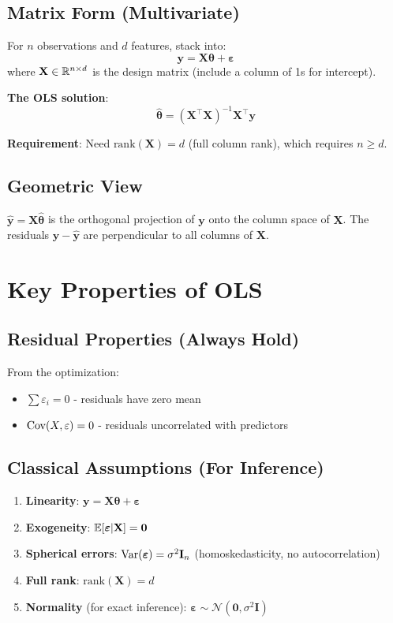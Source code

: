\documentclass[main.tex]{subfiles}
\begin{document}
\subsection{Matrix Form (Multivariate)}

For $n$ observations and $d$ features, stack into:
$$\mathbf{y} = \mathbf{X}\boldsymbol{\theta} + \boldsymbol{\varepsilon}$$
where $\mathbf{X} \in \mathbb{R}^{n \times d}$ is the design matrix (include a column of 1s for intercept).

\textbf{The OLS solution}:
$$\boxed{\hat{\boldsymbol{\theta}} = (\mathbf{X}^\top\mathbf{X})^{-1}\mathbf{X}^\top\mathbf{y}}$$

\textbf{Requirement}: Need $\text{rank}(\mathbf{X}) = d$ (full column rank), which requires $n \geq d$.

\subsection{Geometric View}

$\hat{\mathbf{y}} = \mathbf{X}\hat{\boldsymbol{\theta}}$ is the orthogonal projection of $\mathbf{y}$ onto the column space of $\mathbf{X}$. The residuals $\mathbf{y} - \hat{\mathbf{y}}$ are perpendicular to all columns of $\mathbf{X}$.

\section{Key Properties of OLS}

\subsection{Residual Properties (Always Hold)}

From the optimization:
\begin{itemize}
    \item $\sum \varepsilon_i = 0$ - residuals have zero mean
    \item $\text{Cov}(X, \varepsilon) = 0$ - residuals uncorrelated with predictors
\end{itemize}

\subsection{Classical Assumptions (For Inference)}

\begin{enumerate}
    \item \textbf{Linearity}: $\mathbf{y} = \mathbf{X}\boldsymbol{\theta} + \boldsymbol{\varepsilon}$
    \item \textbf{Exogeneity}: $\mathbb{E}[\boldsymbol{\varepsilon} | \mathbf{X}] = \mathbf{0}$
    \item \textbf{Spherical errors}: $\text{Var}(\boldsymbol{\varepsilon}) = \sigma^2 \mathbf{I}_n$ (homoskedasticity, no autocorrelation)
    \item \textbf{Full rank}: $\text{rank}(\mathbf{X}) = d$
    \item \textbf{Normality} (for exact inference): $\boldsymbol{\varepsilon} \sim \mathcal{N}(\mathbf{0}, \sigma^2\mathbf{I})$
\end{enumerate}
\end{document}
